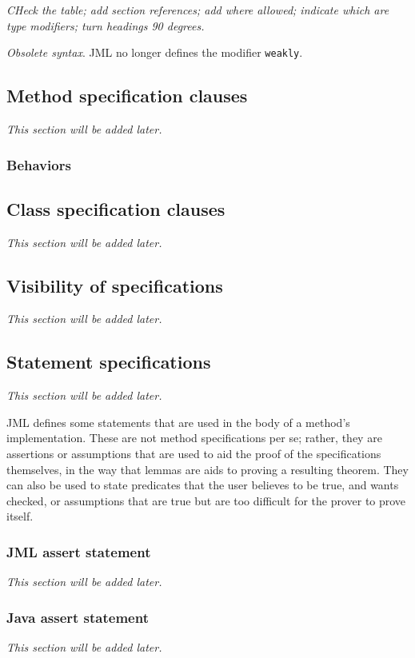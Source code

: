 \textit{CHeck the table; add section references; add where allowed; indicate which are type modifiers; turn headings 90 degrees.} %

\textit{Obsolete syntax}. JML no longer defines the modifier \texttt{weakly}. 

\subsection{Method specification clauses}
\textit{This section will be added later.} %

\subsubsection{Behaviors}

\subsection{Class specification clauses}
\textit{This section will be added later.} %

\subsection{Visibility of specifications}
\textit{This section will be added later.} %

\subsection{Statement specifications}
\textit{This section will be added later.} %

JML defines some statements that are used in the body of a method's implementation. These are not method specifications per se; 
rather, they are assertions or assumptions that are used to aid the proof of the specifications themselves, in the way that lemmas
are aids to proving a resulting theorem. They can also be used to state predicates that the user believes to be true, and wants checked, or assumptions that are true but are too difficult for the prover to prove itself.

\subsubsection{JML assert statement}
\textit{This section will be added later.} %

\subsubsection{Java assert statement}
\textit{This section will be added later.} %

